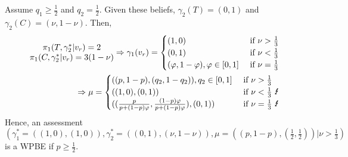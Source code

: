 \documentclass[]{article}
\begin{document}
Assume $q_1 \geq \frac{1}{2}$ and $q_2 = \frac{1}{2}$. Given these beliefs, $\gamma_2(T) = (0, 1)$ and $\gamma_2(C) = (\nu, 1 - \nu)$. Then,
\begin{equation}
	\begin{split}
		\begin{matrix}
			\pi_1(T, \gamma_2^*|v_r) = 2 \\ \nonumber
			\pi_1(C, \gamma_2^*|v_r) = 3(1 - \nu)
		\end{matrix} \Rightarrow \gamma_1(v_r) = \begin{cases}
			(1, 0) & \text{ if } \nu > \frac{1}{3} \\
			(0, 1) & \text{ if } \nu < \frac{1}{3} \\
			(\varphi, 1 - \varphi), \varphi\in[0, 1] & \text{ if } \nu = \frac{1}{3}
		\end{cases} \\
		\Rightarrow \mu = \begin{cases}
			((p, 1 - p), (q_2, 1 - q_2)), q_2\in [0, 1] &\text{ if } \nu > \frac{1}{3}\\
			((1, 0), (0, 1)) &\text{ if } \nu < \frac{1}{3}\text{ \Lightning}\\
			((\frac{p}{p + (1 - p)\varphi}, \frac{(1 - p)\varphi}{p + (1 - p)\varphi}), (0, 1)) &\text{ if } \nu = \frac{1}{3}\text{ \Lightning}\\
		\end{cases}
	\end{split}
\end{equation}
Hence, an assessment $(\gamma_1^* = ((1, 0), (1, 0)), \gamma_2^* = ((0, 1), (\nu, 1 - \nu)), \mu = ((p, 1 - p), (\frac{1}{2}, \frac{1}{2}))| \nu > \frac{1}{3})$ is a WPBE if $p \geq \frac{1}{2}$.
\end{document}
